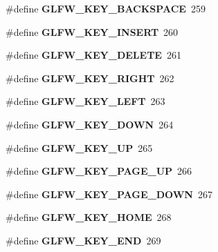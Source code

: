 \begin{DoxyCompactItemize}
\item 
\mbox{\label{group__keys_ga6c0df1fe2f156bbd5a98c66d76ff3635}} 
\#define {\bfseries G\+L\+F\+W\+\_\+\+K\+E\+Y\+\_\+\+B\+A\+C\+K\+S\+P\+A\+CE}~259
\item 
\mbox{\label{group__keys_ga373ac7365435d6b0eb1068f470e34f47}} 
\#define {\bfseries G\+L\+F\+W\+\_\+\+K\+E\+Y\+\_\+\+I\+N\+S\+E\+RT}~260
\item 
\mbox{\label{group__keys_gadb111e4df74b8a715f2c05dad58d2682}} 
\#define {\bfseries G\+L\+F\+W\+\_\+\+K\+E\+Y\+\_\+\+D\+E\+L\+E\+TE}~261
\item 
\mbox{\label{group__keys_ga06ba07662e8c291a4a84535379ffc7ac}} 
\#define {\bfseries G\+L\+F\+W\+\_\+\+K\+E\+Y\+\_\+\+R\+I\+G\+HT}~262
\item 
\mbox{\label{group__keys_gae12a010d33c309a67ab9460c51eb2462}} 
\#define {\bfseries G\+L\+F\+W\+\_\+\+K\+E\+Y\+\_\+\+L\+E\+FT}~263
\item 
\mbox{\label{group__keys_gae2e3958c71595607416aa7bf082be2f9}} 
\#define {\bfseries G\+L\+F\+W\+\_\+\+K\+E\+Y\+\_\+\+D\+O\+WN}~264
\item 
\mbox{\label{group__keys_ga2f3342b194020d3544c67e3506b6f144}} 
\#define {\bfseries G\+L\+F\+W\+\_\+\+K\+E\+Y\+\_\+\+UP}~265
\item 
\mbox{\label{group__keys_ga3ab731f9622f0db280178a5f3cc6d586}} 
\#define {\bfseries G\+L\+F\+W\+\_\+\+K\+E\+Y\+\_\+\+P\+A\+G\+E\+\_\+\+UP}~266
\item 
\mbox{\label{group__keys_gaee0a8fa442001cc2147812f84b59041c}} 
\#define {\bfseries G\+L\+F\+W\+\_\+\+K\+E\+Y\+\_\+\+P\+A\+G\+E\+\_\+\+D\+O\+WN}~267
\item 
\mbox{\label{group__keys_ga41452c7287195d481e43207318c126a7}} 
\#define {\bfseries G\+L\+F\+W\+\_\+\+K\+E\+Y\+\_\+\+H\+O\+ME}~268
\item 
\mbox{\label{group__keys_ga86587ea1df19a65978d3e3b8439bedd9}} 
\#define {\bfseries G\+L\+F\+W\+\_\+\+K\+E\+Y\+\_\+\+E\+ND}~269

\end{DoxyCompactItemize}
